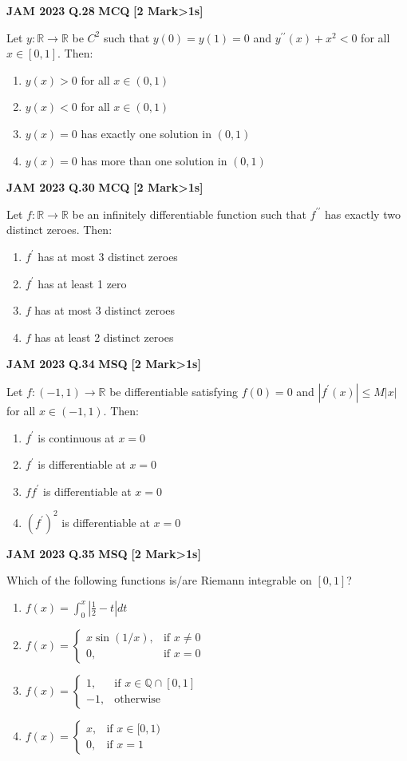 \documentclass[11pt,a4paper]{article}
\newcommand{\pyqheader}[4]{%
    \noindent\begin{tcolorbox}[
        colback=badgebg,
        colframe=secondary,
        arc=2mm,
        boxrule=0.6pt,
        top=1.5mm,bottom=1.5mm,left=2mm,right=2mm
    ]
        \textbf{\textcolor{primary}{JAM #1}} \hfill \textbf{Q.#2} \hfill \textsc{\textbf{#3}} \hfill \textbf{[#4 Mark\ifnum#4>1s\fi]}
    \end{tcolorbox}\vspace{-1mm}
}
\begin{document}
\pyqheader{2023}{28}{MCQ}{2}
Let $y:\mathbb{R}\rightarrow\mathbb{R}$ be $C^2$ such that $y(0)=y(1)=0$ and $y^{\prime\prime}(x)+x^{2}<0$ for all $x\in[0,1]$. Then:
\begin{enumerate}[label=(\Alph*)]
    \item $y(x)>0$ for all $x\in(0,1)$
    \item $y(x)<0$ for all $x\in(0,1)$
    \item $y(x)=0$ has exactly one solution in $(0,1)$
    \item $y(x)=0$ has more than one solution in $(0,1)$
\end{enumerate}

\pyqheader{2023}{30}{MCQ}{2}
Let $f:\mathbb{R}\rightarrow\mathbb{R}$ be an infinitely differentiable function such that $f^{\prime\prime}$ has exactly two distinct zeroes. Then:
\begin{enumerate}[label=(\Alph*)]
    \item $f^{\prime}$ has at most 3 distinct zeroes
    \item $f^{\prime}$ has at least 1 zero
    \item $f$ has at most 3 distinct zeroes
    \item $f$ has at least 2 distinct zeroes
\end{enumerate}

\pyqheader{2023}{34}{MSQ}{2}
Let $f:(-1,1)\rightarrow\mathbb{R}$ be differentiable satisfying $f(0)=0$ and $|f^{\prime}(x)|\le M|x|$ for all $x\in(-1,1)$. Then:
\begin{enumerate}[label=(\Alph*)]
    \item $f^{\prime}$ is continuous at $x=0$
    \item $f^{\prime}$ is differentiable at $x=0$
    \item $ff^{\prime}$ is differentiable at $x=0$
    \item $(f^{\prime})^{2}$ is differentiable at $x=0$
\end{enumerate}

\pyqheader{2023}{35}{MSQ}{2}
Which of the following functions is/are Riemann integrable on $[0,1]$?
\begin{enumerate}[label=(\Alph*)]
    \item $f(x)=\int_{0}^{x}|\frac{1}{2}-t|dt$
    \item $f(x)=\begin{cases}x\sin(1/x),& \text{if } x\ne 0\\ 0,& \text{if } x=0\end{cases}$
    \item $f(x)=\begin{cases}1,& \text{if } x\in\mathbb{Q}\cap[0,1]\\ -1,& \text{otherwise}\end{cases}$
    \item $f(x)=\begin{cases}x,& \text{if } x\in[0,1)\\ 0,& \text{if } x=1\end{cases}$
\end{enumerate}
\end{document}
